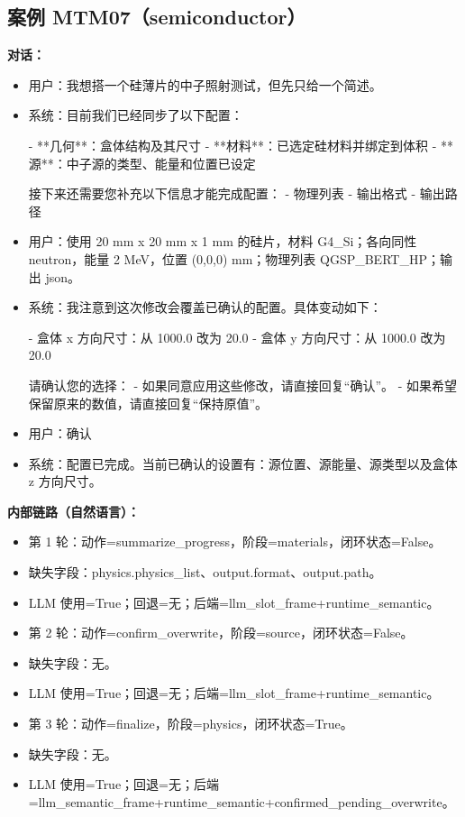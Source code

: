 \documentclass[11pt]{ctexart}
\begin{document}
\subsection{案例 MTM07（semiconductor）}
\textbf{对话：}
\begin{itemize}
\item 用户：我想搭一个硅薄片的中子照射测试，但先只给一个简述。
\item 系统：目前我们已经同步了以下配置：

- **几何**：盒体结构及其尺寸
- **材料**：已选定硅材料并绑定到体积
- **源**：中子源的类型、能量和位置已设定

接下来还需要您补充以下信息才能完成配置：
- 物理列表
- 输出格式
- 输出路径
\item 用户：使用 20 mm x 20 mm x 1 mm 的硅片，材料 G4\_Si；各向同性 neutron，能量 2 MeV，位置 (0,0,0) mm；物理列表 QGSP\_BERT\_HP；输出 json。
\item 系统：我注意到这次修改会覆盖已确认的配置。具体变动如下：

- 盒体 x 方向尺寸：从 1000.0 改为 20.0
- 盒体 y 方向尺寸：从 1000.0 改为 20.0

请确认您的选择：
- 如果同意应用这些修改，请直接回复“确认”。
- 如果希望保留原来的数值，请直接回复“保持原值”。
\item 用户：确认
\item 系统：配置已完成。当前已确认的设置有：源位置、源能量、源类型以及盒体 z 方向尺寸。
\end{itemize}
\textbf{内部链路（自然语言）：}
\begin{itemize}
\item 第 1 轮：动作=summarize\_progress，阶段=materials，闭环状态=False。
\item 缺失字段：physics.physics\_list、output.format、output.path。
\item LLM 使用=True；回退=无；后端=llm\_slot\_frame+runtime\_semantic。
\item 第 2 轮：动作=confirm\_overwrite，阶段=source，闭环状态=False。
\item 缺失字段：无。
\item LLM 使用=True；回退=无；后端=llm\_slot\_frame+runtime\_semantic。
\item 第 3 轮：动作=finalize，阶段=physics，闭环状态=True。
\item 缺失字段：无。
\item LLM 使用=True；回退=无；后端=llm\_semantic\_frame+runtime\_semantic+confirmed\_pending\_overwrite。
\end{itemize}
\end{document}

